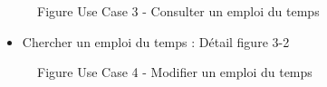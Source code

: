 \documentclass[a4paper, 11pt]{article}
\begin{document}
        \begin{figure}[h]
        \caption{Figure Use Case 3 - Consulter un emploi du temps}
        \label{fig-diag-use-case-3}
        \end{figure}
        \begin{itemize}
        \item Chercher un emploi du temps : Détail figure 3-2
        \end{itemize}
	\begin{figure}[h]
        \caption{Figure Use Case 4 - Modifier un emploi du temps}
        \label{fig-diag-use-case-4}
        \end{figure}
\end{document}
